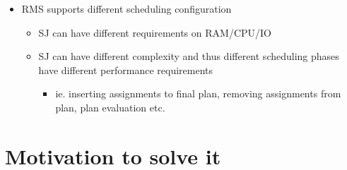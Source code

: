 \begin{itemize}
\begin{itemize}
    \end{itemize}
    \item RMS supports different scheduling configuration
    \begin{itemize}
        \item SJ can have different requirements on RAM/CPU/IO
        \item SJ can have different complexity and thus different scheduling phases have different performance requirements
        \begin{itemize}
            \item ie.
            inserting assignments to final plan, removing assignments from plan, plan evaluation etc.
        \end{itemize}
    \end{itemize}
\end{itemize}

\section{Motivation to solve it}\label{sec:motivation-to-solve-it}


